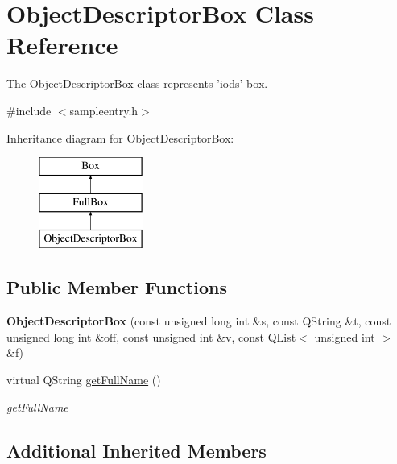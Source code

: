 \hypertarget{class_object_descriptor_box}{\section{Object\-Descriptor\-Box Class Reference}
\label{class_object_descriptor_box}
}


The \hyperlink{class_object_descriptor_box}{Object\-Descriptor\-Box} class represents 'iods' box.  




{\ttfamily \#include $<$sampleentry.\-h$>$}

Inheritance diagram for Object\-Descriptor\-Box\-:\begin{figure}[H]
\begin{center}
\leavevmode
\includegraphics[height=3.000000cm]{class_object_descriptor_box}
\end{center}
\end{figure}
\subsection*{Public Member Functions}
\begin{DoxyCompactItemize}
\item 
\hypertarget{class_object_descriptor_box_a33a5cff5c71960739f4f99bacbe1c78f}{{\bfseries Object\-Descriptor\-Box} (const unsigned long int \&s, const Q\-String \&t, const unsigned long int \&off, const unsigned int \&v, const Q\-List$<$ unsigned int $>$ \&f)}\label{class_object_descriptor_box_a33a5cff5c71960739f4f99bacbe1c78f}

\item 
virtual Q\-String \hyperlink{class_object_descriptor_box_ae01792b840bd4547ecc0aba4ee665998}{get\-Full\-Name} ()
\begin{DoxyCompactList}\small\item\em get\-Full\-Name \end{DoxyCompactList}\end{DoxyCompactItemize}
\subsection*{Additional Inherited Members}


